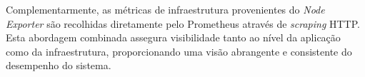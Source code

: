 Complementarmente, as métricas de infraestrutura provenientes do \textit{Node Exporter} são recolhidas diretamente pelo Prometheus através de \textit{scraping} HTTP. Esta abordagem combinada assegura visibilidade tanto ao nível da aplicação como da infraestrutura, proporcionando uma visão abrangente e consistente do desempenho do sistema.







